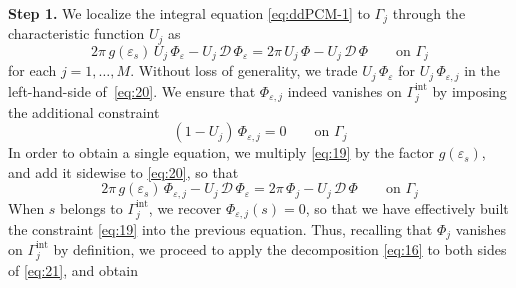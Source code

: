 {\bf Step 1.} 
We localize the integral equation \eqref{eq:ddPCM-1} to $\Gamma_j$ through the characteristic function $U_j$ as
\begin{equation}\label{eq:20}
2 \pi \, g(\varepsilon_s) \, U_j \, \Phi_{\varepsilon} - U_j \, {\mathcal{D} \, \Phi}_\varepsilon = 2 \pi \, U_j \, \Phi - U_j \, {\mathcal{D} \, \Phi} \qquad \text{on }\Gamma_j
\end{equation}
for each $j=1,\ldots,M$. 
Without loss of generality, we trade $U_j \, \Phi_\varepsilon$ for $U_j \, \Phi_{\varepsilon,j}$ in the left-hand-side of~\eqref{eq:20}.
We ensure that $\Phi_{\varepsilon,j}$ indeed vanishes on $\Gamma_j^\text{int}$ by imposing the additional constraint
\begin{equation}\label{eq:19}
(1 - U_j) \, \Phi_{\varepsilon,j}  = 0\qquad \text{on }\Gamma_j 
\end{equation}
In order to obtain a single equation, we multiply \eqref{eq:19} by the factor $g(\varepsilon_s)$, and add it sidewise to \eqref{eq:20}, so that
\begin{equation}\label{eq:21}
2 \pi \, g(\varepsilon_s) \, \Phi_{\varepsilon,j} - U_j \, {\mathcal{D} \, \Phi}_\varepsilon = 2 \pi \, \Phi_j - U_j \, {\mathcal{D} \, \Phi} \qquad \text{on }\Gamma_j
\end{equation}
When $s$ belongs to $\Gamma_j^\text{int}$, we recover $\Phi_{\varepsilon,j}(s) = 0$, so that we have effectively built the constraint \eqref{eq:19} into the previous equation. Thus, recalling that $\Phi_j$ vanishes on $\Gamma_j^\text{int}$ by definition, we proceed to apply the decomposition \eqref{eq:16} to both sides of \eqref{eq:21}, and obtain
